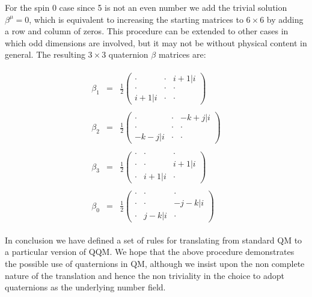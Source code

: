 For the spin 0 case since 5 is not an even number we add the trivial
solution $\beta^{\mu}=0$, which is equivalent to increasing the starting
matrices to $6 \times 6$ by adding a row and column of zeros. This
procedure can be extended to other cases in which odd dimensions are
involved, but it may not be without physical content in general. The
resulting $3 \times 3$ quaternion $\beta$ matrices are:

\begin{eqnarray}
\begin{array}{ccc}
\beta_{1} & = & \frac{1}{2} \left( \begin{array}{ccc}
\cdot & \cdot & i+1\vert i\\
\cdot & \cdot & \cdot\\
i+1\vert i & \cdot & \cdot  \end{array} \right)\\ \\
\beta_{2} & = & \frac{1}{2} \left( \begin{array}{ccc}
\cdot & \cdot & -k+j\vert i\\
\cdot & \cdot & \cdot\\
-k-j\vert i & \cdot & \cdot  \end{array} \right)\\ \\
\beta_{3} & = & \frac{1}{2} \left( \begin{array}{ccc}
\cdot & \cdot & \cdot\\
\cdot & \cdot & i+1\vert i\\
\cdot & i+1\vert i & \cdot  \end{array} \right)\\ \\
\beta_{0} & = & \frac{1}{2} \left( \begin{array}{ccc}
\cdot & \cdot & \cdot\\
\cdot & \cdot & -j-k\vert i\\
\cdot & j-k\vert i & \cdot \end{array} \right)
\end{array}
\end{eqnarray}

In conclusion we have defined a set of rules for translating from
standard QM to
a particular version of QQM. We hope that the above procedure demonstrates
the possible use of quaternions in QM, although we insist upon the non
complete nature of the translation and hence the non triviality in the
choice to adopt quaternions as the underlying number field.

